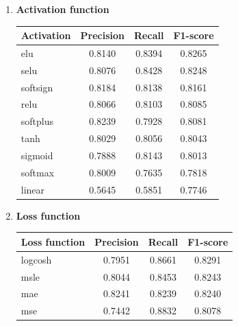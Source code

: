 \begin{enumerate}
    \item \textbf{Activation function}\\
        \vspace{-0.6cm}
        \begin{table}[htbp]
            \centering
            \begin{tabular}{l|c|c|c}
            \textbf{Activation} & \textbf{Precision} & \textbf{Recall} & \textbf{F1-score} \\ \hline
            elu         &	0.8140    &	0.8394    &	0.8265 \\
            selu        &	0.8076    &	0.8428    &	0.8248 \\
            softsign    &	0.8184    &	0.8138    &	0.8161 \\
            relu        &	0.8066    &	0.8103    &	0.8085 \\
            softplus    &	0.8239    &	0.7928    &	0.8081 \\
            tanh        &	0.8029    &	0.8056    &	0.8043 \\
            sigmoid     &	0.7888    &	0.8143    &	0.8013 \\
            softmax     &	0.8009    &	0.7635    &	0.7818 \\
            linear      &	0.5645    &	0.5851    &	0.7746 \\
            \end{tabular}
        \end{table}
    
    \item \textbf{Loss function}\\
        \vspace{-0.5cm}
        \begin{table}[htbp]
            \centering
            \begin{tabular}{l|c|c|c}
                \textbf{Loss function} & \textbf{Precision} & \textbf{Recall} & \textbf{F1-score} \\ \hline
                    logcosh &	0.7951    &	0.8661    &	0.8291 \\
                    msle    &	0.8044    &	0.8453    &	0.8243 \\
                    mae     &	0.8241    &	0.8239    &	0.8240 \\
                    mse     &	0.7442    &	0.8832    &	0.8078 \\
            \end{tabular}
        \end{table}
        

\end{enumerate}
